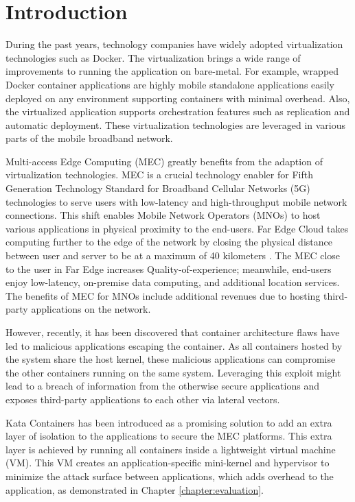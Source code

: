 \chapter{Introduction}
\label{chapter:intro}

During the past years, technology companies have widely adopted virtualization technologies such as Docker. The virtualization brings a wide range of improvements to running the application on bare-metal. For example, wrapped Docker container applications are highly mobile standalone applications easily deployed on any environment supporting containers with minimal overhead. Also, the virtualized application supports orchestration features such as replication and automatic deployment. These virtualization technologies are leveraged in various parts of the mobile broadband network.

Multi-access Edge Computing (MEC) greatly benefits from the adaption of virtualization technologies. MEC is a crucial technology enabler for Fifth Generation Technology Standard for Broadband Cellular Networks (5G) technologies to serve users with low-latency and high-throughput mobile network connections. This shift enables Mobile Network Operators (MNOs) to host various applications in physical proximity to the end-users. Far Edge Cloud takes computing further to the edge of the network by closing the physical distance between user and server to be at a maximum of 40 kilometers \cite{AirFrameOpenEdgeServer}. The MEC close to the user in Far Edge increases Quality-of-experience; meanwhile, end-users enjoy low-latency, on-premise data computing, and additional location services. The benefits of MEC for MNOs include additional revenues due to hosting third-party applications on the network.

However, recently, it has been discovered that container architecture flaws have led to malicious applications escaping the container. As all containers hosted by the system share the host kernel, these malicious applications can compromise the other containers running on the same system. Leveraging this exploit might lead to a breach of information from the otherwise secure applications and exposes third-party applications to each other via lateral vectors.

Kata Containers \cite{KataContainers} has been introduced as a promising solution to add an extra layer of isolation to the applications to secure the MEC platforms. This extra layer is achieved by running all containers inside a lightweight virtual machine (VM). This VM creates an application-specific mini-kernel and hypervisor to minimize the attack surface between applications, which adds overhead to the application, as demonstrated in Chapter \ref{chapter:evaluation}.

